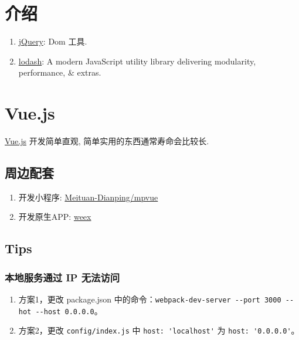 \section{介绍}\label{ux4ecbux7ecd}

\begin{enumerate}
\def\labelenumi{\arabic{enumi}.}
\tightlist
\item
  \href{https://github.com/jquery/jquery}{jQuery}: Dom 工具.
\item
  \href{https://github.com/lodash/lodash}{lodash}: A modern JavaScript
  utility library delivering modularity, performance, \& extras.
\end{enumerate}

\section{Vue.js}\label{vue.js}

\href{https://github.com/vuejs/vue}{Vue.js} 开发简单直观,
简单实用的东西通常寿命会比较长.

\subsection{周边配套}\label{ux5468ux8fb9ux914dux5957}

\begin{enumerate}
\def\labelenumi{\arabic{enumi}.}
\tightlist
\item
  开发小程序:
  \href{https://github.com/Meituan-Dianping/mpvue}{Meituan-Dianping/mpvue}
\item
  开发原生APP: \href{https://weex.apache.org/}{weex}
\end{enumerate}

\subsection{Tips}\label{tips}

\subsubsection{本地服务通过 IP
无法访问}\label{ux672cux5730ux670dux52a1ux901aux8fc7-ip-ux65e0ux6cd5ux8bbfux95ee}

\begin{enumerate}
\def\labelenumi{\arabic{enumi}.}
\tightlist
\item
  方案1，更改 package.json
  中的命令：\lstinline!webpack-dev-server --port 3000 --hot --host 0.0.0.0!。
\item
  方案2，更改 \lstinline!config/index.js! 中
  \lstinline!host: 'localhost'! 为 \lstinline!host: '0.0.0.0'!。
\end{enumerate}

